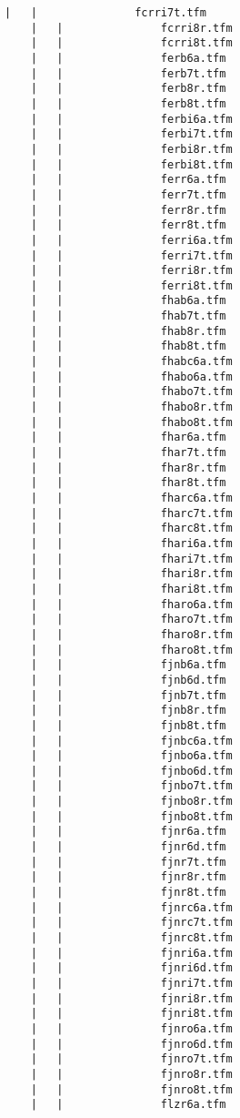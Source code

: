 \begin{lstlisting}[frame=tb, extendedchars=false, breaklines=false, basicstyle=\footnotesize\upshape ,columns=flexible ,keepspaces=true , lineskip={-7.0pt} ]
    |   |               fcrri7t.tfm
    |   |               fcrri8r.tfm
    |   |               fcrri8t.tfm
    |   |               ferb6a.tfm
    |   |               ferb7t.tfm
    |   |               ferb8r.tfm
    |   |               ferb8t.tfm
    |   |               ferbi6a.tfm
    |   |               ferbi7t.tfm
    |   |               ferbi8r.tfm
    |   |               ferbi8t.tfm
    |   |               ferr6a.tfm
    |   |               ferr7t.tfm
    |   |               ferr8r.tfm
    |   |               ferr8t.tfm
    |   |               ferri6a.tfm
    |   |               ferri7t.tfm
    |   |               ferri8r.tfm
    |   |               ferri8t.tfm
    |   |               fhab6a.tfm
    |   |               fhab7t.tfm
    |   |               fhab8r.tfm
    |   |               fhab8t.tfm
    |   |               fhabc6a.tfm
    |   |               fhabo6a.tfm
    |   |               fhabo7t.tfm
    |   |               fhabo8r.tfm
    |   |               fhabo8t.tfm
    |   |               fhar6a.tfm
    |   |               fhar7t.tfm
    |   |               fhar8r.tfm
    |   |               fhar8t.tfm
    |   |               fharc6a.tfm
    |   |               fharc7t.tfm
    |   |               fharc8t.tfm
    |   |               fhari6a.tfm
    |   |               fhari7t.tfm
    |   |               fhari8r.tfm
    |   |               fhari8t.tfm
    |   |               fharo6a.tfm
    |   |               fharo7t.tfm
    |   |               fharo8r.tfm
    |   |               fharo8t.tfm
    |   |               fjnb6a.tfm
    |   |               fjnb6d.tfm
    |   |               fjnb7t.tfm
    |   |               fjnb8r.tfm
    |   |               fjnb8t.tfm
    |   |               fjnbc6a.tfm
    |   |               fjnbo6a.tfm
    |   |               fjnbo6d.tfm
    |   |               fjnbo7t.tfm
    |   |               fjnbo8r.tfm
    |   |               fjnbo8t.tfm
    |   |               fjnr6a.tfm
    |   |               fjnr6d.tfm
    |   |               fjnr7t.tfm
    |   |               fjnr8r.tfm
    |   |               fjnr8t.tfm
    |   |               fjnrc6a.tfm
    |   |               fjnrc7t.tfm
    |   |               fjnrc8t.tfm
    |   |               fjnri6a.tfm
    |   |               fjnri6d.tfm
    |   |               fjnri7t.tfm
    |   |               fjnri8r.tfm
    |   |               fjnri8t.tfm
    |   |               fjnro6a.tfm
    |   |               fjnro6d.tfm
    |   |               fjnro7t.tfm
    |   |               fjnro8r.tfm
    |   |               fjnro8t.tfm
    |   |               flzr6a.tfm

\end{lstlisting}
